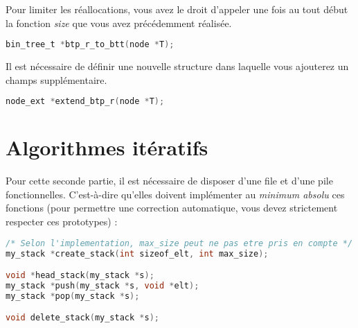 \documentclass[11pt,a4paper]{article}
\begin{document}

Pour limiter les réallocations, vous avez le droit d'appeler une fois au tout début la fonction \textit{size} que vous avez précédemment réalisée.

\begin{lstlisting}[language=C]
bin_tree_t *btp_r_to_btt(node *T); \end{lstlisting}



Il est nécessaire de définir une nouvelle structure  dans laquelle vous ajouterez un champs supplémentaire.

\begin{lstlisting}[language=C]
node_ext *extend_btp_r(node *T); \end{lstlisting}

\bigskip

\clearpage

\section{Algorithmes itératifs}

\bigskip

Pour cette seconde partie, il est nécessaire de disposer d'une file et d'une pile fonctionnelles.
C'est-à-dire qu'elles doivent implémenter au \textit{minimum absolu} ces fonctions (pour permettre une correction automatique, vous devez strictement respecter ces prototypes) :

\bigskip


\begin{lstlisting}[language=C]
/* Selon l'implementation, max_size peut ne pas etre pris en compte */
my_stack *create_stack(int sizeof_elt, int max_size);

void *head_stack(my_stack *s);
my_stack *push(my_stack *s, void *elt);
my_stack *pop(my_stack *s);

void delete_stack(my_stack *s); \end{lstlisting}
\end{document}
